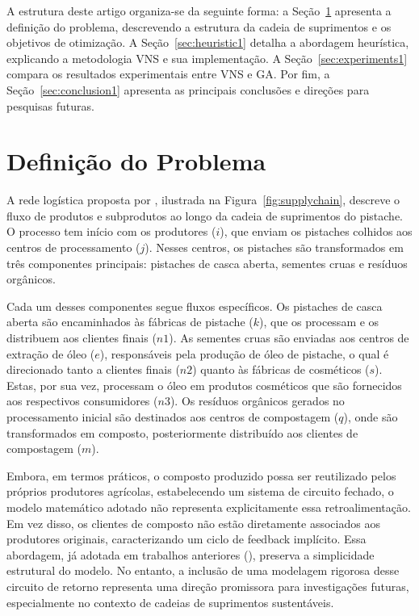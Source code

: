 \documentclass[conference]{IEEEtran}
\begin{document}
A estrutura deste artigo organiza-se da seguinte forma: a Seção~\ref{sec:problem-def1} apresenta a definição do problema, descrevendo a estrutura da cadeia de suprimentos e os 
objetivos de otimização. A Seção~\ref{sec:heuristic1} detalha a abordagem heurística, explicando a metodologia VNS e sua implementação. A Seção~\ref{sec:experiments1} compara os 
resultados experimentais entre VNS e GA. Por fim, a Seção~\ref{sec:conclusion1} apresenta as principais conclusões e direções para pesquisas futuras.

\section{Definição do Problema}
\label{sec:problem-def1}

A rede logística proposta por \cite{b2}, ilustrada na Figura~\ref{fig:supplychain}, descreve o fluxo de produtos e subprodutos ao longo da cadeia de suprimentos do pistache. O processo tem 
início com os produtores (\(i\)), que enviam os pistaches colhidos aos centros de processamento (\(j\)). Nesses centros, os pistaches são transformados em três componentes principais: 
pistaches de casca aberta, sementes cruas e resíduos orgânicos.

Cada um desses componentes segue fluxos específicos. Os pistaches de casca aberta são encaminhados às fábricas de pistache (\(k\)), que os processam e os distribuem aos clientes finais (\(n1\)). 
As sementes cruas são enviadas aos centros de extração de óleo (\(e\)), responsáveis pela produção de óleo de pistache, o qual é direcionado tanto a clientes finais (\(n2\)) quanto às fábricas de cosméticos
(\(s\)). Estas, por sua vez, processam o óleo em produtos cosméticos que são fornecidos aos respectivos consumidores (\(n3\)). Os resíduos orgânicos gerados no processamento inicial são destinados aos centros 
de compostagem (\(q\)), onde são transformados em composto, posteriormente distribuído aos clientes de compostagem (\(m\)).

Embora, em termos práticos, o composto produzido possa ser reutilizado pelos próprios produtores agrícolas, estabelecendo um sistema de circuito fechado, o modelo matemático adotado não representa 
explicitamente essa retroalimentação. Em vez disso, os clientes de composto não estão diretamente associados aos produtores originais, caracterizando um ciclo de feedback implícito. Essa abordagem, 
já adotada em trabalhos anteriores (\hspace{-0.03em}\cite{b11,b19,b20}), preserva a simplicidade estrutural do modelo. No entanto, a inclusão de uma modelagem rigorosa desse circuito de retorno 
representa uma direção promissora para investigações futuras, especialmente no contexto de cadeias de suprimentos sustentáveis.
\end{document}
